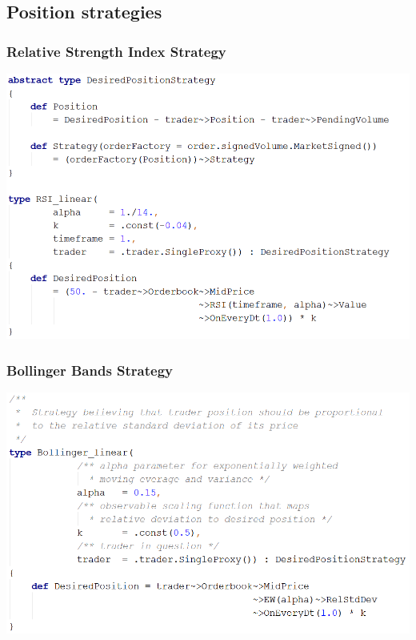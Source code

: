 \documentclass{beamer}
\begin{document}
\subsection{Position strategies}
\begin{frame}
\frametitle{Relative Strength Index Strategy}
\includegraphics[width=1\linewidth]{rsi_strategy.png}
\end{frame}
\begin{frame}
\frametitle{Bollinger Bands Strategy}
\includegraphics[width=1\linewidth]{bollinger_strategy.png}
\end{frame}
\end{document}
